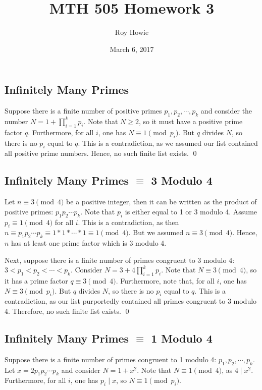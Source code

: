 \documentclass{article}
\begin{document}
\title{\vspace{-2.5cm}MTH 505 Homework 3}
\author{Roy Howie}
\date{March 6, 2017}
\maketitle

\subsection{Infinitely Many Primes}
  Suppose there is a finite number of positive primes $p_1,p_2,\cdots,p_k$ and
  consider the number $N=1+\prod_{i=1}^k{p_i}$. Note that $N\ge2$, so it must
  have a positive prime factor $q$. Furthermore, for all $i$, one has $N\equiv1
  \pmod{p_i}$. But $q$ divides $N$, so there is no $p_i$ equal to $q$. This is a
  contradiction, as we assumed our list contained all positive prime numbers.
  Hence, no such finite list exists.
  \qed

\subsection{Infinitely Many Primes $\equiv$ 3 Modulo 4}
  Let $n\equiv3\pmod{4}$ be a positive integer, then it can be written as the
  product of positive primes: $p_1p_2\cdots p_k$. Note that $p_i$ is either
  equal to 1 or 3 modulo 4. Assume $p_i\equiv1\pmod{4}$ for all $i$. This is a
  contradiction, as then $n\equiv p_1p_2\cdots p_k\equiv1*1*\cdots
  *1\equiv1\pmod{4}$. But we assumed $n\equiv3\pmod{4}$. Hence, $n$ has at least
  one prime factor which is 3 modulo 4.

  Next, suppose there is a finite number of primes congruent to 3 modulo 4: $3<
  p_1 <p_2<\cdots<p_k$. Consider $N=3+4\prod_{i=1}^k{p_i}$. Note that $N\equiv3
  \pmod{4}$, so it has a prime factor $q\equiv3\pmod{4}$. Furthermore, note
  that, for all $i$, one has $N\equiv3\pmod{p_i}$. But $q$ divides $N$, so there
  is no $p_i$ equal to $q$. This is a contradiction, as our list purportedly
  contained all primes congruent to 3 modulo 4. Therefore, no such finite list
  exists.
  \qed

\subsection{Infinitely Many Primes $\equiv$ 1 Modulo 4}
  Suppose there is a finite number of primes congruent to 1 modulo 4: $p_1,p_2,
  \cdots,p_k$. Let $x=2p_1p_2\cdots p_k$ and consider $N=1+x^2$. Note that $N
  \equiv1\pmod{4}$, as $4\mid x^2$. Furthermore, for all $i$, one has $p_i\mid
  x$, so $N\equiv1\pmod{p_i}$.
\end{document}
